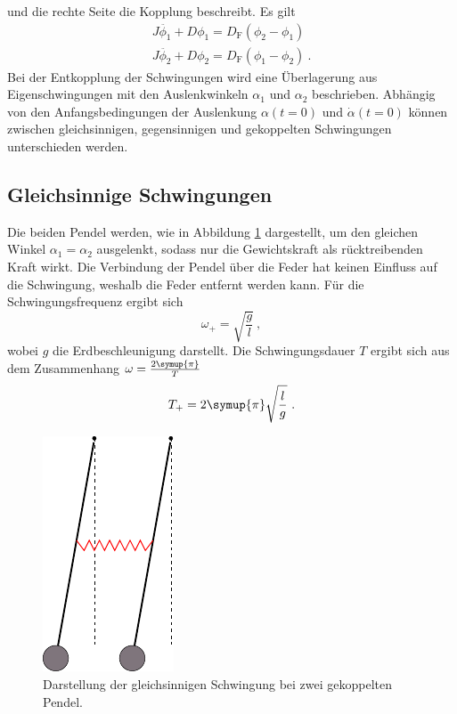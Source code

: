     und die rechte Seite die Kopplung beschreibt.
    Es gilt
    \begin{gather*}
        J \ddot{\phi_1} + D \phi_1 = D_\text{F}(\phi_2 - \phi_1) 
        \label{eqn:dgl1_kopplung}\\
        J \ddot{\phi_2} + D \phi_2 = D_\text{F}(\phi_1 - \phi_2) \ .
        \label{eqn:dgl2_kopplung}
    \end{gather*}
    Bei der Entkopplung der Schwingungen wird eine Überlagerung aus Eigenschwingungen mit den Auslenkwinkeln $\alpha_1$ und $\alpha_2$ beschrieben.
    Abhängig von den Anfangsbedingungen der Auslenkung $\alpha(t=0)$ und $\dot{\alpha}(t=0)$ können zwischen gleichsinnigen,
    gegensinnigen und gekoppelten Schwingungen unterschieden werden.

\subsection{Gleichsinnige Schwingungen}
\label{sec:gleichsinnige_schwingung}

    Die beiden Pendel werden,
    wie in Abbildung \ref{fig:gleichsinnig} dargestellt,
    um den gleichen Winkel $\alpha_1 = \alpha_2$ ausgelenkt,
    sodass nur die Gewichtskraft als rücktreibenden Kraft wirkt.
    Die Verbindung der Pendel über die Feder hat keinen Einfluss auf die Schwingung,
    weshalb die Feder entfernt werden kann.
    Für die Schwingungsfrequenz ergibt sich
    \begin{equation}
        \omega_+ = \sqrt{\frac{g}{l}} \ ,
        \label{eqn:frequenz_gleichsinnig}
    \end{equation}
    wobei $g$ die Erdbeschleunigung darstellt.
    Die Schwingungsdauer $T$ ergibt sich aus dem Zusammenhang $\omega = \frac{2\symup{\pi}}{T}$ 
    \begin{equation}
        T_+ = 2\symup{\pi} \sqrt{\frac{l}{g}} \ .
        \label{eqn:dauer_gleichsinnig}
    \end{equation}

    \begin{figure} 
        \centering
        \includegraphics[scale=0.9]{content/img/Abb_1.pdf}
        \caption{Darstellung der gleichsinnigen Schwingung bei zwei gekoppelten Pendel.}
        \label{fig:gleichsinnig}
    \end{figure}

